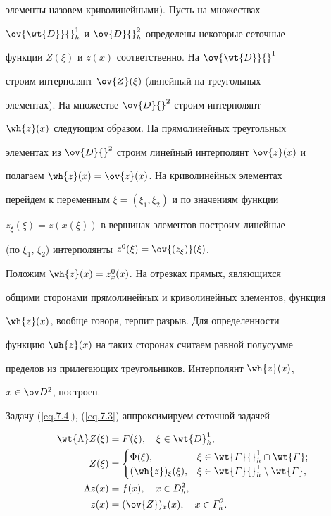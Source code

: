 элементы назовем криволинейными). Пусть на множествах


$\ov{\wt{D}}{}^1_h$ и $\ov{D}{}^2_h$ определены некоторые сеточные


функции $Z(\xi)$ и $z(x)$ соответственно. На $\ov{\wt{D}}{}^1$


строим интерполянт $\ov{Z}(\xi)$ (линейный на треугольных


элементах). На множестве $\ov{D}{}^2$ строим интерполянт


$\wh{z}(x)$ следующим образом. На прямолинейных треугольных


элементах из $\ov{D}{}^2$ строим линейный интерполянт $\ov{z}(x)$ и


полагаем $\wh{z}(x)=\ov{z}(x)$. На криволинейных элементах


перейдем к переменным $\xi=(\xi_1,\xi_2)$ и по значениям функции


$z_{\xi}(\xi)=z(x(\xi))$ в вершинах элементов построим линейные


(по $\xi_1$, $\xi_2$) интерполянты $z^0(\xi)=\ov{(z_{\xi})}(\xi)$.


Положим $\wh{z}(x)=z^0_x(x)$. На отрезках прямых, являющихся


общими сторонами прямолинейных и криволинейных элементов, функция


$\wh{z}(x)$, вообще говоря, терпит разрыв. Для определенности


функцию $\wh{z}(x)$ на таких сторонах считаем равной полусумме


пределов из прилегающих треугольников. Интерполянт $\wh{z}(x)$,


$x\in\od{}^2$, построен.





Задачу (\ref{eq.7.4}), (\ref{eq.7.3}) аппроксимируем сеточной задачей


\begin{subequations} \label{eq.6.2}


\begin{align}\label{eq.6.2a}


\wt{\La} Z(\xi) & = F(\xi), \quad


\xi \in \wt{D}_h^1, \\


Z(\xi) & = \begin{cases}


\Phi(\xi), & \xi\in\wt{\varGamma}{}^1_{h}\cap \wt{\varGamma}; \\


(\wh{z})_{\xi}(\xi), & \xi\in\wt{\varGamma}{}^1_{h}\setminus \wt{\varGamma},


\end{cases}


\notag \\


\label{eq.6.2b}


\La z(x) & = f(x), \quad x\in D_h^2, \\


z(x) & = (\ov{Z})_x(x), \quad x\in\varGamma^2_{h}.\notag


\end{align}


\end{subequations}


